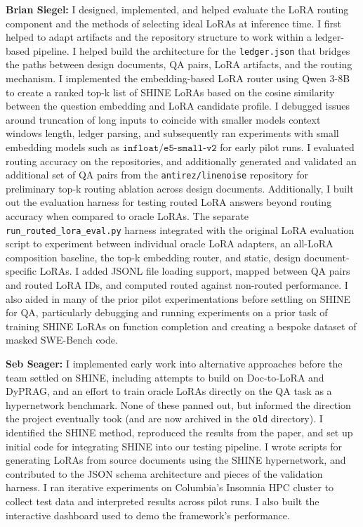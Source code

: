 \documentclass[conference,10.5pt]{IEEEtran}
\begin{document}
\textbf{Brian Siegel:} I designed, implemented, and helped evaluate the LoRA routing component and the methods of selecting ideal LoRAs at inference time. I first helped to adapt artifacts and the repository structure to work within a ledger-based pipeline. I helped build the architecture for the \texttt{ledger.json} that bridges the paths between design documents, QA pairs, LoRA artifacts, and the routing mechanism. I implemented the embedding-based LoRA router using Qwen 3-8B to create a ranked top-k list of SHINE LoRAs based on the cosine similarity between the question embedding and LoRA candidate profile. I debugged issues around truncation of long inputs to coincide with smaller models context windows length, ledger parsing, and subsequently ran experiments with small embedding models such as $\texttt{infloat/e5-small-v2}$ for early pilot runs. I evaluated routing accuracy on the repositories, and additionally generated and validated an additional set of QA pairs from the \texttt{antirez/linenoise} repository for preliminary top-k routing ablation across design documents. 
Additionally, I built out the evaluation harness for testing routed LoRA answers beyond routing accuracy when compared to oracle LoRAs. The separate \texttt{run\_routed\_lora\_eval.py} harness integrated with the original LoRA evaluation script to experiment between individual oracle LoRA adapters, an all-LoRA composition baseline, the top-k embedding router, and static, design document-specific LoRAs. I added JSONL file loading support, mapped between QA pairs and routed LoRA IDs, and computed routed against non-routed performance. I also aided in many of the prior pilot experimentations before settling on SHINE for QA, particularly debugging and running experiments on a prior task of training SHINE LoRAs on function completion and creating a bespoke dataset of masked SWE-Bench code.
 
\textbf{Seb Seager:} I implemented early work into alternative approaches before the team settled on SHINE, including attempts to build on Doc-to-LoRA and DyPRAG, and an effort to train oracle LoRAs directly on the QA task as a hypernetwork benchmark. None of these panned out, but informed the direction the project eventually took (and are now archived in the \texttt{old} directory). I identified the SHINE method, reproduced the results from the paper, and set up initial code for integrating SHINE into our testing pipeline. I wrote scripts for generating LoRAs from source documents using the SHINE hypernetwork, and contributed to the JSON schema architecture and pieces of the validation harness. I ran iterative experiments on Columbia's Insomnia HPC cluster to collect test data and interpreted results across pilot runs. I also built the interactive dashboard used to demo the framework's performance.
\end{document}
